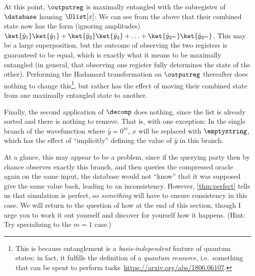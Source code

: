       \noindent
      At this point, $\outputreg$ is maximally entangled with the
        subregister of $\database$ housing $\Dlist[x]$: 
        We can see from the above that their combined
        state now has the form (ignoring amplitudes) 
        $\ket{\hat{y}_1}\ket{\hat{y}_1} +
        \ket{\hat{y}_2}\ket{\hat{y}_2} + \ldots +
        \ket{\hat{y}_{2^m}}\ket{\hat{y}_{2^m}}$. This may be a large superposition,
        but the outcome of observing the two registers is guaranteed to be
        equal, which is exactly what it means to be maximally entangled (in
        general, that observing one register fully determines the state of the other).
        Performing the Hadamard transformation on $\outputreg$ thereafter does nothing to change
        this\footnote{
          This is because entanglement is a \emph{basis-independent} feature of
          quantum states; in fact, it fulfills the definition of a \emph{quantum resource},
          i.e.\ something that can be spent to perform tasks~\url{https://arxiv.org/abs/1806.06107}.
        }, but rather has the effect of moving their combined state from one maximally
        entangled state to another.%

      Finally, the second application of
        $\decomp$ does nothing, since the list is already sorted and there is
        nothing to remove. That is, with one exception: In the single branch of the
        wavefunction where $\hat{y} = 0^m$, $x$ will be replaced with
        $\emptystring$, which has the effect of ``implicitly'' defining the
        value of $\hat{y}$ in this branch. 

      At a glance, this may appear to be a
        problem, since if the querying party then by chance observes exactly
        this branch, and then queries the compressed oracle again on the same
        input, the database would not ``know'' that it was supposed give the same
        value back, leading to an inconsistency. However, \cref{thm:perfect}
        tells us that simulation is perfect, so \emph{something} will have
        to ensure consistency in this case. We will return to the question
        of how at the end of this section, though I urge you to work it out
        yourself and discover for yourself how it happens.
        (Hint: Try specializing to the $m=1$ case.)

